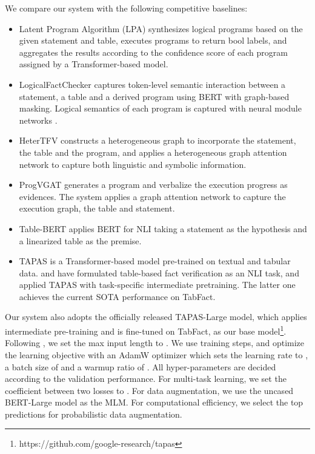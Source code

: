 \documentclass[11pt]{article}
\newcommand{\stitle}[1]{\vspace{0.3em} \noindent{\bf #1.}}
\begin{document}
\stitle{Baselines}
We compare our system with the following competitive baselines:
\begin{itemize}[leftmargin=1em]
\setlength\itemsep{0.2em}
\item Latent Program Algorithm (LPA) \cite{chen2019tabfact} synthesizes logical programs based on the given statement and table, executes programs to return bool labels, and aggregates the results according to the confidence score of each program assigned by a Transformer-based model. 

\item LogicalFactChecker \cite{zhong2020logicalfactchecker} captures token-level semantic interaction between a statement, a table and a derived program using BERT with graph-based masking. Logical semantics of each program is captured with neural module networks \cite{andreas2016learning}. 



\item HeterTFV \cite{shi2020learn} constructs a heterogeneous graph to incorporate the statement, the table and the program, and applies a heterogeneous graph attention network to capture both linguistic and symbolic information.


\item ProgVGAT \cite{yang2020program} generates a program and verbalize the execution progress as evidences. The system applies a graph attention network \cite{velivckovic2017graph} to capture the execution graph, the table and statement.



\item Table-BERT \cite{chen2019tabfact} applies BERT for NLI taking a statement as the hypothesis and a linearized table as the premise.

\item TAPAS \cite{herzig2020tapas} is a Transformer-based model pre-trained on textual and tabular data. \citet{dong2021structural} and \citet{eisenschlos2020understanding} have formulated table-based fact verification as an NLI task, and applied TAPAS with task-specific intermediate pretraining. The latter one achieves the current SOTA performance on TabFact.

\end{itemize}



\stitle{Model Configurations}
Our system also adopts the officially released TAPAS-Large model, which applies intermediate pre-training and is fine-tuned on TabFact, as our base model\footnote{https://github.com/google-research/tapas}.
Following \citet{eisenschlos2020understanding}, we set the max input length to .
We use  training steps, and optimize the learning objective with an AdamW optimizer \cite{loshchilov2018decoupled} which sets the learning rate to , a batch size of  and a warmup ratio of .
All hyper-parameters are decided according to the validation performance.
For multi-task learning, we set the coefficient between two losses  to .
For data augmentation, we use the uncased BERT-Large model as the MLM.
For computational efficiency, we select the top  predictions for probabilistic data augmentation.
\end{document}
